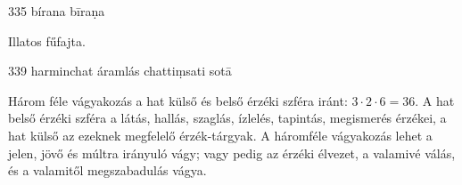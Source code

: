 
\begin{notesdescription}

\item[{335}
{bírana}
{bīraṇa}] \hfill\par

Illatos fűfajta.

\item[{339}
{harminchat áramlás}
{chattiṃsati sotā}] \hfill\par

Három féle vágyakozás a hat külső és belső érzéki szféra iránt: $3 \cdot 2 \cdot 6 = 36$. A hat belső érzéki szféra a látás, hallás, szaglás, ízlelés, tapintás, megismerés érzékei, a hat külső az ezeknek megfelelő érzék-tárgyak. A háromféle vágyakozás lehet a jelen, jövő és múltra irányuló vágy; vagy pedig az érzéki élvezet, a valamivé válás, és a valamitől megszabadulás vágya.

\end{notesdescription}

